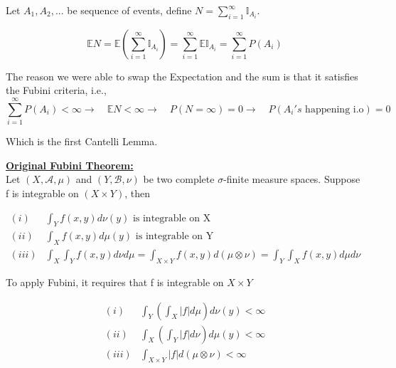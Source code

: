 \documentclass[11pt]{report}
\begin{document}
Let $A_1,A_2,...$ be sequence of events, define $N=\sum_{i=1}^{\infty}\mathbb{I}_{A_i}$. 

\begin{equation}
\mathbb{E}N=\mathbb{E}\left(\sum_{i=1}^{\infty}\mathbb{I}_{A_i}\right)=\sum_{i=1}^{\infty}\mathbb{E}\mathbb{I}_{A_i}=\sum_{i=1}^{\infty}P(A_i)\nonumber
\end{equation}

The reason we were able to swap the Expectation and the sum is that it satisfies the Fubini criteria, i.e., 
\begin{equation}
\sum_{i=1}^{\infty}P(A_i)<\infty \rightarrow\quad \mathbb{E}N<\infty \rightarrow\quad P(N=\infty)=0 \rightarrow \quad P(A_i's \text{  happening i.o})=0 \nonumber
\end{equation}

Which is the first Cantelli Lemma.

\bigskip


\underline{{\bf {Original Fubini Theorem:}}}  \\

Let $(X,\mathcal{A},\mu)$ and $(Y,\mathcal{B},\nu)$ be two complete $\sigma$-finite measure spaces. Suppose f is integrable on $(X\times Y)$, then

\begin{equation}
\begin{aligned}
(i)&\int_Yf(x,y)d\nu(y)\text{ is integrable on X}\\
(ii)&\int_Xf(x,y)d\mu(y)\text{ is integrable on Y}\\
(iii)& \int_X\int_Yf(x,y)d\nu d\mu=\int_{X\times Y}f(x,y)d (\mu \otimes \nu)=\int_Y\int_Xf(x,y)d\mu d\nu
\end{aligned}
\end{equation}

\bigskip


To apply Fubini, it requires that f is integrable on $X \times Y$

\begin{equation}
\begin{aligned}
(i)&\int_Y\left(\int_X|f| d\mu \right)d\nu(y)<\infty\\
(ii)&\int_X\left(\int_Y|f| d\nu \right)d\mu(y)<\infty\\
(iii)& \int_{X\times Y}|f| d(\mu \otimes \nu) <\infty
\end{aligned}
\end{equation}




\end{document}
